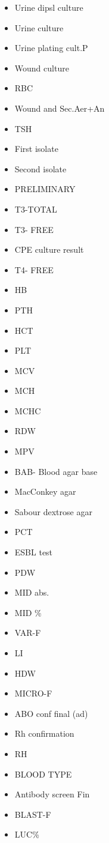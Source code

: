 \documentclass[a4paper,12pt]{article}
\begin{document}
\begin{appendices}
\begin{itemize}
   			\item Urine dipsl culture
   			\item Urine culture
   			\item Urine plating cult.P
   			\item Wound culture
   			\item RBC
   			\item Wound and Sec.Aer+An
   			\item TSH
   			\item First isolate
   			\item Second isolate
   			\item PRELIMINARY
   			\item T3-TOTAL
   			\item T3- FREE
   			\item CPE culture result
   			\item T4- FREE
   			\item HB
   			\item PTH
   			\item HCT
   			\item PLT
   			\item MCV
   			\item MCH
   			\item MCHC
   			\item RDW
   			\item MPV
   			\item BAB- Blood agar base
   			\item MacConkey agar
   			\item Sabour dextrose agar
   			\item PCT
   			\item ESBL test
   			\item PDW
   			\item MID abs.
   			\item MID \%
   			\item VAR-F
   			\item LI
   			\item HDW
   			\item MICRO-F
   			\item ABO conf final (ad)
   			\item Rh confirmation
   			\item RH
   			\item BLOOD TYPE
   			\item Antibody screen Fin
   			\item BLAST-F
   			\item LUC\%

\end{itemize}
\end{appendices}
\end{document}
